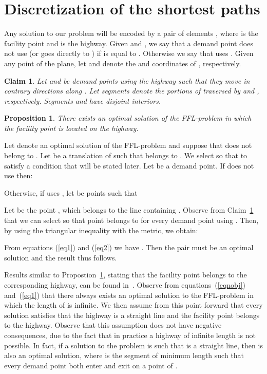 \documentclass[11pt,a4paper,oneside,onecolumn]{article}
\newtheorem{claim}[theorem]{Claim}
\newtheorem{proposition}[theorem]{Proposition}
\def\QED{\ensuremath{{\square}}}
\def\markatright#1{\leavevmode\unskip\nobreak\quad\hspace*{\fill}{#1}}
\newenvironment{proof}
{\begin{trivlist}\item[\hskip\labelsep{\bf Proof.}]}
{\markatright{\QED}\end{trivlist}}
\begin{document}
\section{Discretization of the shortest paths}
\label{section:preliminaries}

Any solution to our problem will be encoded by a pair of elements
, where  is the facility point and  is the highway.
Given  and , we say that a demand point  does not use 
(or goes directly to ) if  is equal to .
Otherwise we say that  uses . Given any point  of the plane,
let  and  denote the  and coordinates of ,
respectively.
\begin{claim}\label{claim1}
Let  and  be demand points using the highway  such that 
they move in contrary directions along . Let segments 
denote the portions of  traversed by  and , respectively.
Segments  and  have disjoint interiors.
\end{claim}
\newpage
\begin{proposition}\label{prop:fac-in-highway}
There exists an optimal solution of the
FFL-problem in which the facility point is located on the highway.
\end{proposition}
\begin{proof}
Let  denote an optimal solution of the FFL-problem and
suppose that  does not belong to . Let  be a translation of 
such that  belongs to . We select  so that to satisfy a condition that
will be stated later. Let  be a demand
point. If  does not use  then:

Otherwise, if  uses , let  be points such that

Let  be the point , which belongs to the line
containing . Observe from
Claim~\ref{claim1}
that we can select  so that point  belongs to  for every
demand point  using . Then, by using the triangular inequality with the
 metric, we obtain:

From equations (\ref{eq1}) and (\ref{eq2}) we have
. Then the pair  must be an
optimal solution and the result thus follows.
\end{proof}

Results similar to Propostion~\ref{prop:fac-in-highway}, stating that
the facility point belongs to the corresponding highway, can be 
found in~\cite{diaz-banez11-3,espejo11}. 
Observe from equations~(\ref{eqnobj}) and~(\ref{eq1})
that there always exists an
optimal solution  to the FFL-problem in which the length of
 is infinite.
We then assume from this
point forward that every solution satisfies that the highway is a straight
line and the facility point belongs to the highway.
Observe that this assumption does not have negative consequences,
due to the fact that in practice a highway of infinite length is not
possible. In fact, if a solution  to the problem is such that
 is a straight line, then  is also an optimal solution,
where  is the segment of minimum length 
such that every demand point both enter and exit  on a point of .
\end{document}
